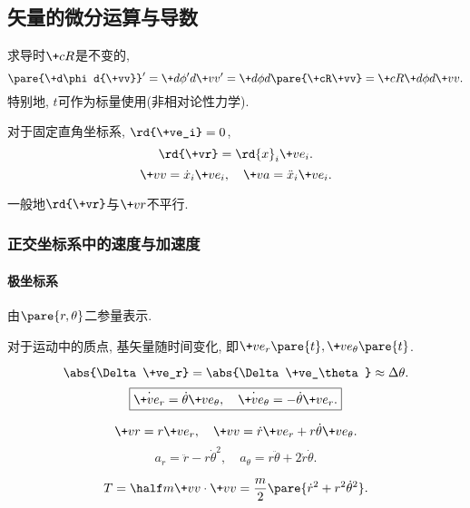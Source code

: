 \documentclass[../LectureNotes.tex]{subfiles}
\begin{document}
\subsection{矢量的微分运算与导数} %
\label{sub:矢量的微分运算与导数}

\begin{lemma}[坐标变换下的导数]
    求导时$\+cR$是不变的,
    \[ \pare{\+d\phi d{\+vv}}' = \+d{\phi'}d{\+vv'} = \+d{\phi}d{\pare{\+cR\+vv}} = \+cR\+d\phi d{\+vv}. \]
    特别地, $t$可作为标量使用(非相对论性力学).
\end{lemma}
\begin{lemma}
    对于固定直角坐标系, $\rd{\+ve_i} = 0$,
    \[ \rd{\+vr} = \rd{x}_i \+ve_i. \]
    \[ \+vv = \dot{x}_i \+ve_i,\quad \+va = \ddot{x}_i \+ve_i. \]
\end{lemma}
\begin{pitfall}
    一般地$\rd{\+vr}$与$\+vr$不平行.
\end{pitfall}

\subsubsection{正交坐标系中的速度与加速度} %
\label{ssub:正交坐标系中的速度与加速度}

\paragraph{极坐标系} %
\label{par:极坐标系}

由$\pare{r,\theta}$二参量表示.

\begin{figure}[ht]
    \centering
\end{figure}
\begin{pitfall}
    对于运动中的质点, 基矢量随时间变化, 即$\+ve_r\pare{t},\+ve_\theta\pare{t}$.
\end{pitfall}

\begin{figure}[ht]
    \centering
\end{figure}
\[ \abs{\Delta\+ve_r} = \abs{\Delta\+ve_\theta} \approx \Delta\theta. \]
\[ \boxed{\dot{\+ve_r} = \dot{\theta}\+ve_\theta,\quad \dot{\+ve_\theta} = -\dot{\theta}\+ve_r.} \]
\begin{finale}
    \begin{theorem}
        \[ \+vr = r\+ve_r,\quad \+vv = \dot{r}\+ve_r + r\dot{\theta}\+ve_\theta. \]
        \[ a_r = \ddot{r} - r\dot{\theta}^2,\quad a_\theta = r\ddot{\theta} + 2\dot{r}\dot{\theta}. \]
    \end{theorem}
\end{finale}
\begin{finale}
    \begin{theorem}[极坐标系下的动能]
        \[ T = \half m\+vv\cdot\+vv = \frac{m}{2}\pare{\dot{r}^2 + r^2\dot{\theta}^2}. \]
    \end{theorem}
\end{finale}
\end{document}
